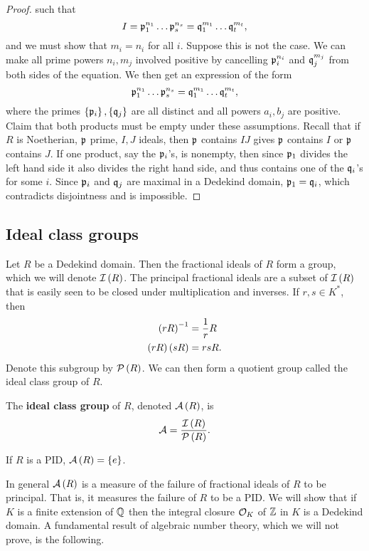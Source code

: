 \begin{proof}
such that
$$ I = \mathfrak{p}_1^{n_1} \dots \mathfrak{p}_s^{n_s} = \mathfrak{q}_1^{m_1} \dots \mathfrak{q}_t^{m_t}, $$
and we must show that $ m_i = n_i $ for all $ i $. Suppose this is not the case. We can make all prime powers $ n_i, m_j $ involved positive by cancelling $ \mathfrak{p}_i^{n_i} $ and $ \mathfrak{q}_j^{m_j} $ from both sides of the equation. We then get an expression of the form
$$ \mathfrak{p}_1^{n_1} \dots \mathfrak{p}_s^{n_s} = \mathfrak{q}_1^{m_1} \dots \mathfrak{q}_t^{m_t}, $$
where the primes $ \left\{ \mathfrak{p}_i \right\}, \left\{ \mathfrak{q}_j \right\} $ are all distinct and all powers $ a_i, b_j $ are positive. Claim that both products must be empty under these assumptions. Recall that if $ R $ is Noetherian, $ \mathfrak{p} $ prime, $ I, J $ ideals, then $ \mathfrak{p} $ contains $ IJ $ gives $ \mathfrak{p} $ contains $ I $ or $ \mathfrak{p} $ contains $ J $. If one product, say the $ \mathfrak{p}_i $'s, is nonempty, then since $ \mathfrak{p}_1 $ divides the left hand side it also divides the right hand side, and thus contains one of the $ \mathfrak{q}_i $'s for some $ i $. Since $ \mathfrak{p}_i $ and $ \mathfrak{q}_j $ are maximal in a Dedekind domain, $ \mathfrak{p}_1 = \mathfrak{q}_i $, which contradicts disjointness and is impossible.
\end{proof}

\subsection{Ideal class groups}

Let $ R $ be a Dedekind domain. Then the fractional ideals of $ R $ form a group, which we will denote $ \mathcal{I}\left( R \right) $. The principal fractional ideals are a subset of $ \mathcal{I}\left( R \right) $ that is easily seen to be closed under multiplication and inverses. If $ r, s \in K^* $, then
\begin{align*}
\left( rR \right)^{-1} & = \dfrac{1}{r}R \\
\left( rR \right)\left( sR \right) & = rsR.
\end{align*}
Denote this subgroup by $ \mathcal{P}\left( R \right) $. We can then form a quotient group called the ideal class group of $ R $.

\begin{definition}
The \textbf{ideal class group} of $ R $, denoted $ \mathcal{A}\left( R \right) $, is
$$ \mathcal{A} = \dfrac{\mathcal{I}\left( R \right)}{\mathcal{P}\left( R \right)}. $$
\end{definition}

\begin{example*}
If $ R $ is a PID, $ \mathcal{A}\left( R \right) = \left\{ e \right\} $.
\end{example*}

In general $ \mathcal{A}\left( R \right) $ is a measure of the failure of fractional ideals of $ R $ to be principal. That is, it measures the failure of $ R $ to be a PID. We will show that if $ K $ is a finite extension of $ \mathbb{Q} $ then the integral closure $ \mathcal{O}_K $ of $ \mathbb{Z} $ in $ K $ is a Dedekind domain. A fundamental result of algebraic number theory, which we will not prove, is the following.

